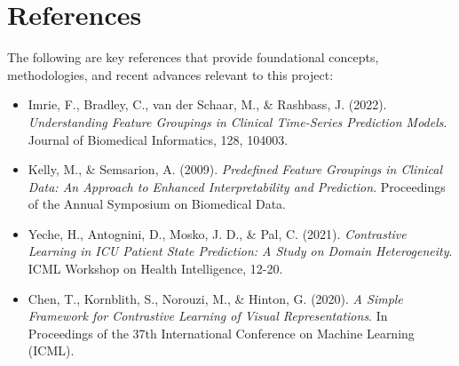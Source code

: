 \documentclass[a4paper]{article}
\begin{document}
\section{References}

The following are key references that provide foundational concepts, methodologies, and recent advances relevant to this project:

\begin{itemize}
    \item Imrie, F., Bradley, C., van der Schaar, M., \& Rashbass, J. (2022). \textit{Understanding Feature Groupings in Clinical Time-Series Prediction Models}. Journal of Biomedical Informatics, 128, 104003.
    
    \item Kelly, M., \& Semsarion, A. (2009). \textit{Predefined Feature Groupings in Clinical Data: An Approach to Enhanced Interpretability and Prediction}. Proceedings of the Annual Symposium on Biomedical Data.
    
    \item Yeche, H., Antognini, D., Mosko, J. D., \& Pal, C. (2021). \textit{Contrastive Learning in ICU Patient State Prediction: A Study on Domain Heterogeneity}. ICML Workshop on Health Intelligence, 12-20.
    
    \item Chen, T., Kornblith, S., Norouzi, M., \& Hinton, G. (2020). \textit{A Simple Framework for Contrastive Learning of Visual Representations}. In Proceedings of the 37th International Conference on Machine Learning (ICML).
\end{itemize}
\end{document}
